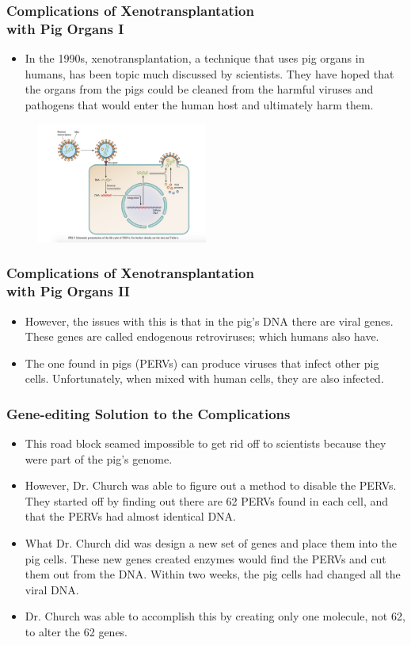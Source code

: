 \documentclass{beamer}
\begin{document}
\begin{frame}
\frametitle{Complications of Xenotransplantation \\with Pig Organs I}
\begin{itemize}
\item
In the 1990s, xenotransplantation, a technique that uses pig organs in humans, has been topic much discussed by scientists. They have hoped that the organs from the pigs could be cleaned from the harmful viruses and pathogens that would enter the human host and ultimately harm them. 
\end{itemize}
\begin{figure}[h!]
  \centering
    \includegraphics[width=0.5\textwidth]{lifecycle.png}
\end{figure}
\end{frame}

\begin{frame}
\frametitle{Complications of Xenotransplantation \\ with Pig Organs II}
\begin{itemize}
\item
However, the issues with this is that in the pig’s DNA there are viral genes. These genes are called endogenous retroviruses; which humans also have. 
\item
The one found in pigs (PERVs) can produce viruses that infect other pig cells. Unfortunately, when mixed with human cells, they are also infected. 
\end{itemize}
\end{frame}


\begin{frame}
\frametitle{Gene-editing Solution to the Complications}
\begin{itemize}
\item
This road block seamed impossible to get rid off to scientists because they were part of the pig’s genome. 
\item
However, Dr. Church was able to figure out a method to disable the PERVs. They started off by finding out there are 62 PERVs found in each cell, and that the PERVs had almost identical DNA. 
\item
What Dr. Church did was design a new set of genes and place them into the pig cells. These new genes created enzymes would find the PERVs and cut them out from the DNA. Within two weeks, the pig cells had changed all the viral DNA. 
\item
Dr. Church was able to accomplish this by creating only one molecule, not 62, to alter the 62 genes.
\end{itemize}
\end{frame}
\end{document}
